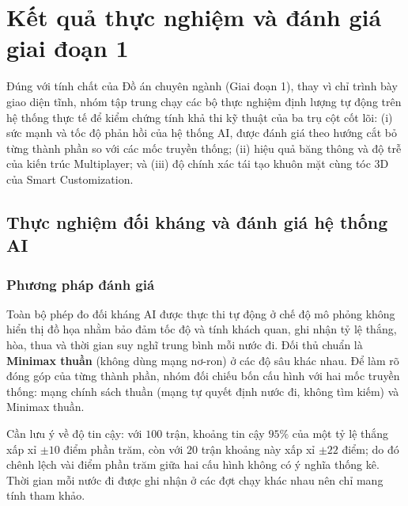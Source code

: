 \section{Kết quả thực nghiệm và đánh giá giai đoạn 1}

Đúng với tính chất của Đồ án chuyên ngành (Giai đoạn 1), thay vì chỉ trình bày giao diện tĩnh, nhóm tập trung chạy các bộ thực nghiệm định lượng tự động trên hệ thống thực tế để kiểm chứng tính khả thi kỹ thuật của ba trụ cột cốt lõi: (i) sức mạnh và tốc độ phản hồi của hệ thống AI, được đánh giá theo hướng cắt bỏ từng thành phần so với các mốc truyền thống; (ii) hiệu quả băng thông và độ trễ của kiến trúc Multiplayer; và (iii) độ chính xác tái tạo khuôn mặt cùng tóc 3D của Smart Customization.

\subsection{Thực nghiệm đối kháng và đánh giá hệ thống AI}
\subsubsection{Phương pháp đánh giá}
Toàn bộ phép đo đối kháng AI được thực thi tự động ở chế độ mô phỏng không hiển thị đồ họa nhằm bảo đảm tốc độ và tính khách quan, ghi nhận tỷ lệ thắng, hòa, thua và thời gian suy nghĩ trung bình mỗi nước đi. Đối thủ chuẩn là \textbf{Minimax thuần} (không dùng mạng nơ-ron) ở các độ sâu khác nhau. Để làm rõ đóng góp của từng thành phần, nhóm đối chiếu bốn cấu hình với hai mốc truyền thống: mạng chính sách thuần (mạng tự quyết định nước đi, không tìm kiếm) và Minimax thuần.

Cần lưu ý về độ tin cậy: với $100$ trận, khoảng tin cậy $95\%$ của một tỷ lệ thắng xấp xỉ $\pm 10$ điểm phần trăm, còn với $20$ trận khoảng này xấp xỉ $\pm 22$ điểm; do đó chênh lệch vài điểm phần trăm giữa hai cấu hình không có ý nghĩa thống kê. Thời gian mỗi nước đi được ghi nhận ở các đợt chạy khác nhau nên chỉ mang tính tham khảo.

